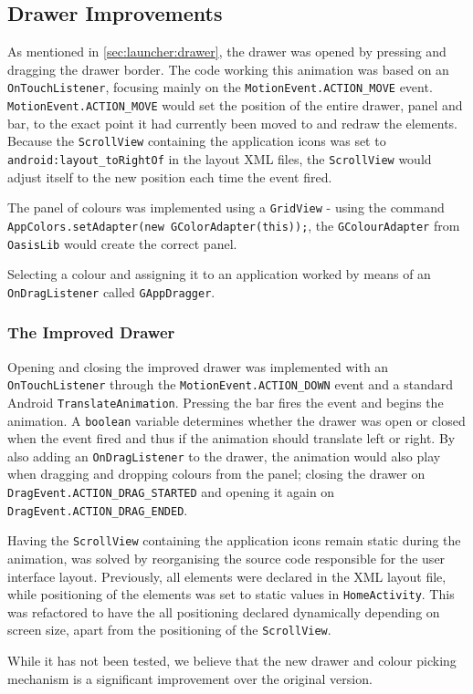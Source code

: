 \subsection{Drawer Improvements}\label{sec:developments:drawerimprovements}
As mentioned in \cref{sec:launcher:drawer}, the drawer was opened by pressing and dragging the drawer border.
The code working this animation was based on an \lstinline{OnTouchListener}, focusing mainly on the \lstinline{MotionEvent.ACTION_MOVE} event.
\lstinline{MotionEvent.ACTION_MOVE} would set the position of the entire drawer, panel and bar, to the exact point it had currently been moved to and redraw the elements.
Because the \lstinline{ScrollView} containing the application icons was set to \lstinline{android:layout_toRightOf} in the layout XML files, the \lstinline{ScrollView} would adjust itself to the new position each time the event fired.

The panel of colours was implemented using a \lstinline{GridView} - using the command \lstinline{AppColors.setAdapter(new GColorAdapter(this));}, the \lstinline{GColourAdapter} from \lstinline{OasisLib} would create the correct panel.

Selecting a colour and assigning it to an application worked by means of an \lstinline{OnDragListener} called \lstinline{GAppDragger}.

\subsubsection*{The Improved Drawer}

Opening and closing the improved drawer was implemented with an \lstinline{OnTouchListener} through the \lstinline{MotionEvent.ACTION_DOWN} event and a standard Android \lstinline{TranslateAnimation}.
Pressing the bar fires the event and begins the animation.
A \lstinline{boolean} variable determines whether the drawer was open or closed when the event fired and thus if the animation should translate left or right.
By also adding an \lstinline{OnDragListener} to the drawer, the animation would also play when dragging and dropping colours from the panel; closing the drawer on \lstinline{DragEvent.ACTION_DRAG_STARTED} and opening it again on \lstinline{DragEvent.ACTION_DRAG_ENDED}.

Having the \lstinline{ScrollView} containing the application icons remain static during the animation, was solved by reorganising the source code responsible for the user interface layout. 
Previously, all elements were declared in the XML layout file, while positioning of the elements was set to static values in \lstinline{HomeActivity}.
This was refactored to have the all positioning declared dynamically depending on screen size, apart from the positioning of the \lstinline{ScrollView}.

While it has not been tested, we believe that the new drawer and colour picking mechanism is a significant improvement over the original version.

